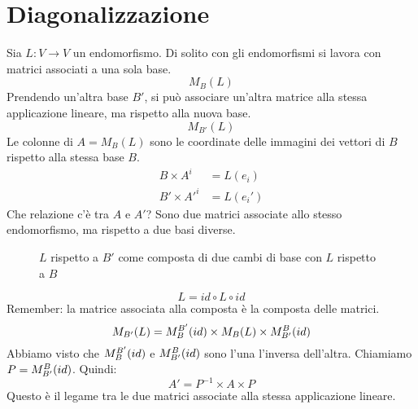 \section{Diagonalizzazione}

Sia $L : V \to V$ un endomorfismo. Di solito con gli endomorfismi si lavora con matrici associati a una sola base.
\[
M_{B} (L)
\]
Prendendo un'altra base $B'$, si pu\`o associare un'altra matrice alla stessa applicazione lineare, ma rispetto alla nuova base.
\[
M_{B'} (L)
\]
Le colonne di $A = M_{B} (L)$ sono le coordinate delle immagini dei vettori di $B$ rispetto alla stessa base $B$.
\begin{align*}
B \times A^i &= L(e_i) \\
B' \times {A'}^i &= L(e_i')
\end{align*}
Che relazione c'\`e tra $A$ e $A'$? Sono due matrici associate allo stesso endomorfismo, ma rispetto a due basi diverse.

\begin{figure}[ht]
\centering
{}
\caption{$L$ rispetto a $B'$ come composta di due cambi di base con $L$ rispetto a $B$}
\end{figure}
\[
L = id \circ L \circ id
\]
Remember: la matrice associata alla composta \`e la composta delle matrici.
\[
M_{B'} (L) =
M_{B}^{B'} (id) \times M_{B} (L) \times M_{B'}^{B} (id)
\]
Abbiamo visto che $M_{B}^{B'} (id)$ e $M_{B'}^{B} (id)$ sono l'una l'inversa dell'altra. Chiamiamo $P = M_{B'}^{B} (id)$. Quindi:
\[
A' = P^{-1} \times A \times P
\]
Questo \`e il legame tra le due matrici associate alla stessa applicazione lineare.

